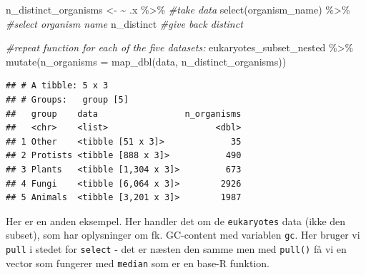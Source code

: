 \documentclass[
]{book}
\newenvironment{Shaded}{\begin{snugshade}}{\end{snugshade}}
\newcommand{\AttributeTok}[1]{\textcolor[rgb]{0.77,0.63,0.00}{#1}}
\newcommand{\CommentTok}[1]{\textcolor[rgb]{0.56,0.35,0.01}{\textit{#1}}}
\newcommand{\ErrorTok}[1]{\textcolor[rgb]{0.64,0.00,0.00}{\textbf{#1}}}
\newcommand{\FunctionTok}[1]{\textcolor[rgb]{0.00,0.00,0.00}{#1}}
\newcommand{\NormalTok}[1]{#1}
\newcommand{\OtherTok}[1]{\textcolor[rgb]{0.56,0.35,0.01}{#1}}
\newcommand{\SpecialCharTok}[1]{\textcolor[rgb]{0.00,0.00,0.00}{#1}}
\begin{document}
\begin{Shaded}
\begin{Highlighting}[]
\NormalTok{n\_distinct\_organisms }\OtherTok{\textless{}{-}} \ErrorTok{\textasciitilde{}}\NormalTok{ .x }\SpecialCharTok{\%\textgreater{}\%} \CommentTok{\#take data}
  \FunctionTok{select}\NormalTok{(organism\_name) }\SpecialCharTok{\%\textgreater{}\%}  \CommentTok{\#select organism name}
\NormalTok{  n\_distinct }\CommentTok{\#give back distinct}
\end{Highlighting}
\end{Shaded}

\begin{Shaded}
\begin{Highlighting}[]
\CommentTok{\#repeat function for each of the five datasets:}
\NormalTok{eukaryotes\_subset\_nested }\SpecialCharTok{\%\textgreater{}\%} 
  \FunctionTok{mutate}\NormalTok{(}\AttributeTok{n\_organisms =} \FunctionTok{map\_dbl}\NormalTok{(data, n\_distinct\_organisms))}
\end{Highlighting}
\end{Shaded}

\begin{verbatim}
## # A tibble: 5 x 3
## # Groups:   group [5]
##   group    data                 n_organisms
##   <chr>    <list>                     <dbl>
## 1 Other    <tibble [51 x 3]>             35
## 2 Protists <tibble [888 x 3]>           490
## 3 Plants   <tibble [1,304 x 3]>         673
## 4 Fungi    <tibble [6,064 x 3]>        2926
## 5 Animals  <tibble [3,201 x 3]>        1987
\end{verbatim}

Her er en anden eksempel. Her handler det om de \texttt{eukaryotes} data (ikke den subset), som har oplysninger om fk. GC-content med variablen \texttt{gc}. Her bruger vi \texttt{pull} i stedet for \texttt{select} - det er næsten den samme men med \texttt{pull()} få vi en vector som fungerer med \texttt{median} som er en base-R funktion.
\end{document}
